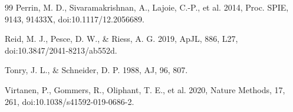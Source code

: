 \documentclass[nodoi,nocopyright]{pas}
\begin{document}
\begin{thebibliography}{99}
Perrin, M. D., Sivaramakrishnan, A., Lajoie, C.-P., et al. 2014,
Proc. SPIE, 9143, 91433X, doi:10.1117/12.2056689.

Reid, M. J., Pesce, D. W., \& Riess, A. G. 2019,
ApJL, 886, L27, doi:10.3847/2041-8213/ab552d.

Tonry, J. L., \& Schneider, D. P. 1988, AJ, 96, 807.

Virtanen, P., Gommers, R., Oliphant, T. E., et al. 2020,
Nature Methods, 17, 261, doi:10.1038/s41592-019-0686-2.

\end{thebibliography}

\label{LastArticlePage}
\end{document}

